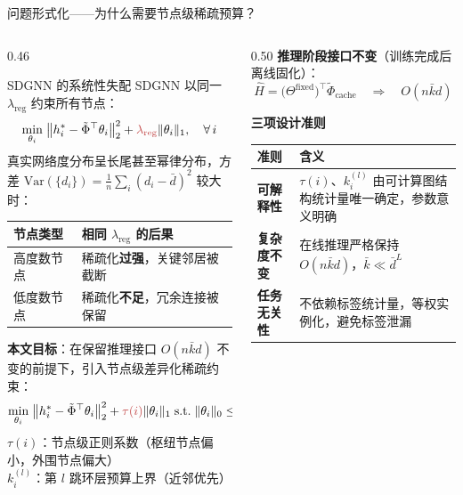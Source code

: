 \documentclass[aspectratio=169,9pt,xcolor=dvipsnames]{beamer}
\newcommand{\highlight}[1]{\textcolor{myred}{\textbf{#1}}}
\newcommand{\blue}[1]{\textcolor{mynavy}{#1}}
\newcommand{\kbar}{\ensuremath{\bar{k}}}
\begin{document}
\begin{frame}{问题形式化——为什么需要节点级稀疏预算？}
\begin{columns}[T]

\begin{column}{0.46\textwidth}
  \begin{alertblock}{SDGNN 的系统性失配}
    SDGNN 以同一 $\lambda_{\mathrm{reg}}$ 约束所有节点：
    \begin{equation*}
      \min_{\theta_i}\;\bigl\|h_i^*-\tilde{\Phi}^\top\theta_i\bigr\|_2^2
      +{\color{myred}\lambda_{\mathrm{reg}}}\|\theta_i\|_1,\quad\forall\,i
    \end{equation*}
    真实网络度分布呈长尾甚至幂律分布，方差
    $\mathrm{Var}(\{d_i\})=\frac{1}{n}\sum_i(d_i-\bar{d})^2$ 较大时：

    \medskip
    \begin{tabular}{ll}
      \toprule
      节点类型 & 相同 $\lambda_{\mathrm{reg}}$ 的后果 \\
      \midrule
      高度数节点 & 稀疏化\highlight{过强}，关键邻居被截断 \\
      低度数节点 & 稀疏化\highlight{不足}，冗余连接被保留 \\
      \bottomrule
    \end{tabular}
  \end{alertblock}

  \medskip
  \textbf{\blue{本文目标}}：在保留推理接口 $O(n\kbar d)$ 不变的前提下，引入节点级差异化稀疏约束：
  \begin{equation*}
    \min_{\theta_i}\;\bigl\|h_i^*-\tilde{\Phi}^\top\theta_i\bigr\|_2^2
    +{\color{myred}\tau(i)}\|\theta_i\|_1
    \;\text{s.t.}\;\|\theta_i\|_0\leq\textstyle\sum_l k_i^{(l)}
  \end{equation*}
  $\tau(i)$：节点级正则系数（枢纽节点偏小，外围节点偏大）\\
  $k_i^{(l)}$：第 $l$ 跳环层预算上界（近邻优先）
\end{column}

\begin{column}{0.50\textwidth}
  \textbf{\blue{推理阶段接口不变}}（训练完成后离线固化）：
  \begin{equation*}
    \hat{H}=\bigl(\Theta^{\mathrm{fixed}}\bigr)^\top\tilde{\Phi}_{\mathrm{cache}}
    \quad\Rightarrow\quad O(n\kbar d)
  \end{equation*}

  \textbf{\blue{三项设计准则}}

  \begin{tabular}{lm{5cm}}
    \toprule
    准则 & 含义 \\
    \midrule
    \textbf{可解释性} & $\tau(i)$、$k_i^{(l)}$ 由可计算图结构统计量唯一确定，参数意义明确 \\[4pt]
    \textbf{复杂度不变} & 在线推理严格保持 $O(n\kbar d)$，$\kbar\ll\bar{d}^L$ \\[4pt]
    \textbf{任务无关性} & 不依赖标签统计量，等权实例化，避免标签泄漏 \\
    \bottomrule
  \end{tabular}


\end{column}
\end{columns}
\end{frame}
\end{document}
